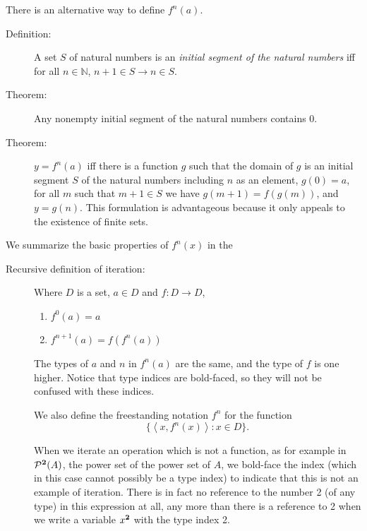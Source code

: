 \documentclass[12pt]{book}
\begin{document}
There is an alternative way to define $f^n(a)$.  

\begin{description}

\item[Definition:] A set $S$ of natural numbers is an {\em initial
segment of the natural numbers\/} iff for all $n \in{\mathbb N}$, $n+1
\in S \rightarrow n \in S$.

\item[Theorem:] Any nonempty initial segment of the natural numbers
contains 0.

\item[Theorem:] $y = f^n(a)$ iff there is a function $g$ such that the
domain of $g$ is an initial segment $S$ of the natural numbers
including $n$ as an element, $g(0) = a$, for all $m$ such that $m+1
\in S$ we have $g(m+1)=f(g(m))$, and $y=g(n)$.  This formulation is
advantageous because it only appeals to the existence of finite sets.

\end{description}

We summarize the basic properties of $f^n(x)$ in the

\begin{description}

\item[Recursive definition of iteration:]  Where $D$ is a set, $a \in D$ and $f:D \rightarrow D$,

\begin{enumerate}

\item $f^0(a)=a$

\item $f^{n+1}(a)=f(f^n(a))$

\end{enumerate}

The types of $a$ and $n$ in $f^n(a)$ are the same, and the type of $f$ is one higher.  Notice that type indices are bold-faced, so they will not be confused with these indices.

We also define the freestanding notation $f^n$ for the function $$\{\left<x,f^n(x)\right>:x \in D\}.$$

When we iterate an operation which is not a function, as for example in ${\cal P}^{\bf 2}(A)$, the power set of the power set of $A$, we bold-face the index (which in this case
cannot possibly be a type index) to indicate that this is not an example of iteration.  There is in fact no reference to the number 2 (of any type) in this expression at all, any more than there is a reference to 2 when we write a variable $x^{\bf 2}$ with the type index 2.

\end{description}
\end{document}
